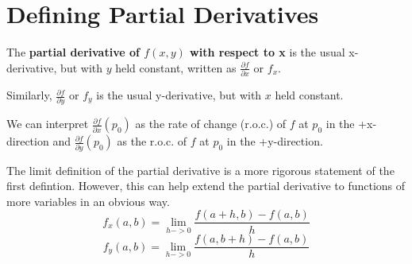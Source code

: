 \documentclass[../main.tex]{subfiles}
\begin{document}

\section{Defining Partial Derivatives}

\begin{definition}
    The \textbf{partial derivative of \( f(x,y) \) with respect to x} is the usual x-derivative, but with \( y \) held
    constant, written as \( \frac{\partial f}{\partial x} \) or \( f_x \).
    
    Similarly, \( \frac{\partial f}{\partial y} \) or \( f_y \) is the usual y-derivative, but with \( x \) held constant.
\end{definition}

We can interpret \( \frac{\partial f}{\partial x}(p_0) \) as the rate of change (r.o.c.) of \( f \) at \( p_0 \) in the
+x-direction and \( \frac{\partial f}{\partial y}(p_0) \) as the r.o.c. of \( f \) at \( p_0 \) in the +y-direction.

The limit definition of the partial derivative is a more rigorous statement of the first defintion. However, this can help
extend the partial derivative to functions of more variables in an obvious way.
\[ f_x(a,b) = \lim_{h->0} \frac{f(a+h,b)-f(a,b)}{h} \]
\[ f_y(a,b) = \lim_{h->0} \frac{f(a,b+h)-f(a,b)}{h} \]
\end{document}
